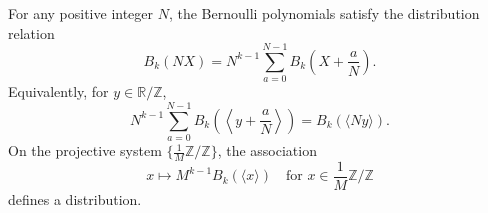 For any positive integer $N$, the Bernoulli polynomials satisfy the distribution relation
$$
B_k(NX) = N^{k-1} \sum_{a=0}^{N-1} B_k\!\left(X + \frac{a}{N}\right).
$$
Equivalently, for $y \in \mathbb{R}/\mathbb{Z}$,
$$
N^{k-1} \sum_{a=0}^{N-1} B_k\!\left(\left\langle y + \frac{a}{N} \right\rangle\right) = B_k(\langle N y \rangle).
$$
On the projective system $\{\frac{1}{M}\mathbb{Z}/\mathbb{Z}\}$, the association
$$
x \mapsto M^{k-1} B_k(\langle x \rangle) \quad \text{for } x \in \frac{1}{M}\mathbb{Z}/\mathbb{Z}
$$
defines a distribution.
